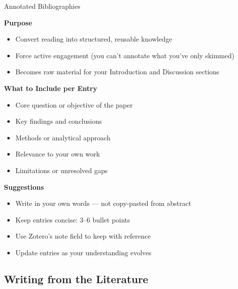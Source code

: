 \documentclass{beamer}
\begin{document}
\begin{frame}{Annotated Bibliographies}

  \footnotesize
  \textbf{Purpose}
  \begin{itemize}
    \item Convert reading into structured, reusable knowledge
    \item Force active engagement
    {\scriptsize (you can't annotate what you've only skimmed)}
    \item Becomes raw material for your Introduction and
      Discussion sections
  \end{itemize}

  \medskip
  \textbf{What to Include per Entry}
  \begin{itemize}
    \item Core question or objective of the paper
    \item Key findings and conclusions
    \item Methods or analytical approach
    \item Relevance to your own work
    \item Limitations or unresolved gaps
  \end{itemize}

  \medskip
  \textbf{Suggestions}
  \begin{itemize}
    \item Write in your own words --- not copy-pasted from abstract
    \item Keep entries concise: 3--6 bullet points
    \item Use Zotero's note field to keep with reference
    \item Update entries as your understanding evolves
  \end{itemize}

\end{frame}


\subsection{Writing from the Literature}
\end{document}
